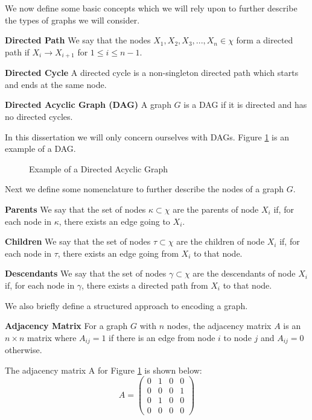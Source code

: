 We now define some basic concepts which we will rely upon to further describe the types of graphs we will consider.
\begin{defn}
\textbf{Directed Path} We say that the nodes $X_1, X_2, X_3,..., X_n \in \chi$ form a directed path if $X_i \rightarrow X_{i+1}$ for $1 \leq i \leq n-1$. 
\end{defn}
\begin{defn}
\textbf{Directed Cycle} A directed cycle is a non-singleton directed path which starts and ends at the same node.
\end{defn}
\begin{defn}
\textbf{Directed Acyclic Graph (DAG)} A graph $G$ is a DAG if it is directed and has no directed cycles.
\end{defn}
In this dissertation we will only concern ourselves with DAGs. Figure \ref{fig_dag} is an example of a DAG.
\begin{figure}[H] 
\centering
{}
\caption{Example of a Directed Acyclic Graph}
\label{fig_dag}
\end{figure}
Next we define some nomenclature to further describe the nodes of a graph $G$.
\begin{defn}
\textbf{Parents} We say that the set of nodes $\kappa \subset \chi$ are the parents of node $X_i$ if, for each node in $\kappa$, there exists an edge going to $X_i$.
\end{defn}
\begin{defn}
\textbf{Children} We say that the set of nodes $\tau \subset \chi$ are the children of node $X_i$ if, for each node in $\tau$, there exists an edge going from $X_i$ to that node.
\end{defn}
\begin{defn}
\textbf{Descendants} We say that the set of nodes $\gamma \subset \chi$ are the descendants of node $X_i$ if, for each node in $\gamma$, there exists a directed path from $X_i$ to that node.
\end{defn}
We also briefly define a structured approach to encoding a graph.
\begin{defn}
\textbf{Adjacency Matrix} For a graph $G$ with $n$ nodes, the adjacency matrix $A$ is an $n \times n$ matrix where $A_{ij} = 1$ if there is an edge from node $i$ to node $j$ and $A_{ij} = 0$ otherwise. 
\end{defn}
The adjacency matrix A for Figure \ref{fig_dag} is shown below:
\begin{equation*}
A = \begin{pmatrix}
0 & 1 & 0 & 0 \\
0 & 0 & 0 & 1 \\
0 & 1 & 0 & 0 \\
0 & 0 & 0 & 0
\end{pmatrix}
\end{equation*}


